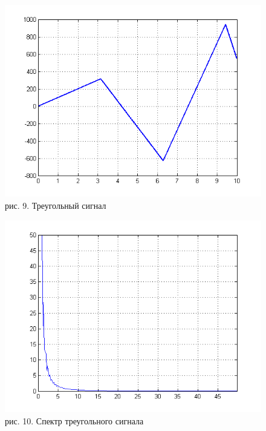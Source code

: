 \documentclass[10pt,a4paper]{report}
\begin{document}
\begin{figure}
\begin{center}
\includegraphics[width=150mm, scale = 0.9]{5_5.png}\newline
рис. 9. Треугольный сигнал\newline
\end{center}
\end{figure}
\begin{figure}
\begin{center}
\includegraphics[width=150mm, scale = 0.9]{5_6.png}\newline
рис. 10. Спектр треугольного сигнала\newline
\end{center}
\end{figure}
\end{document}
